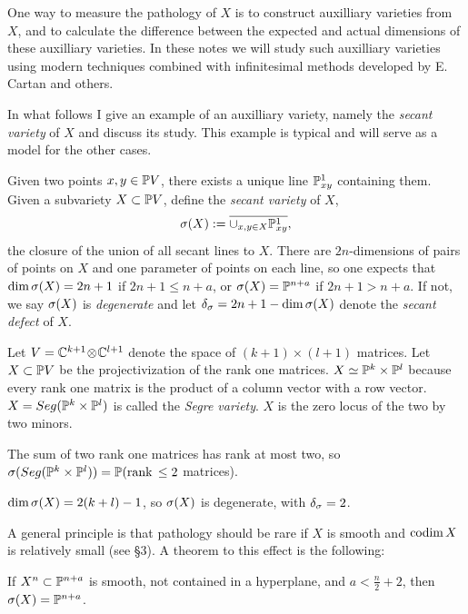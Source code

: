  
One way to measure the pathology of $X$ is to
 construct auxilliary varieties from $X$, and to calculate the
difference between the expected and actual 
     dimensions   of these auxilliary varieties.  
 In these notes we will  study such auxilliary 
varieties using modern techniques
combined with infinitesimal methods developed by
E. Cartan and others.

 

 In what follows I 
give an example of an auxilliary variety,
namely the {\it secant variety} of
$X$ and discuss its study. This example is typical   and will serve as a
model
for the other cases.



Given two points $x, y\in \Bbb P V$, there exists a unique
line $\Bbb P^1_{xy}$ containing them.
Given a subvariety $X\subset\Bbb P V$,   define
the {\it secant variety} of $X$, 
$$
\sigma (X):= \overline{\cup_{x,y\in X}\Bbb P^1_{xy}},
$$
 the closure of the union of all secant lines   to
$X$. There are $2n$-dimensions   of pairs of points
on $X$ and  one parameter of points on each line, so one expects
that $\text{dim}\,\sigma (X)= 2n+1$ if $2n+1\leq n+a$, or $\sigma (X)=\Bbb P^{n+a}$   if $2n+1>n+a$.
If not, 
we say $\sigma (X)$ is {\it degenerate} and  let $\delta_{\sigma}= 2n+1-\text{dim}\,\sigma (X)$ denote
the
{\it secant defect} of $X$.  

 
Let $V= \Bbb C^{k+1}\!\otimes\!\Bbb C^{l+1}$ denote the space of 
$(k+1)\times (l+1)$ matrices. Let $X\subset \Bbb P V$ be the projectivization
of the rank one matrices.   $X\simeq \Bbb P^{k}\times \Bbb P^{l}$
because every rank one matrix is the product of a column vector with
a row vector.
$X=Seg(\Bbb P^{k}\times\Bbb P^{l})$ is  called the {\it Segre variety}. $X$ is the
zero
locus of the   two by two minors.

The sum of two rank one matrices has rank at
most two, so   $\sigma(Seg(\Bbb P^{k}\times\Bbb P^{l}))=\Bbb P (\text{rank}\,\leq 2$ matrices). 

   $\text{dim}\,\sigma (X) = 2(k+l)-1$,
so $\sigma (X)$ is degenerate, with $\delta_{\sigma}=2$.

\smallpagebreak

A general principle  is
that pathology should be rare if $X$ is smooth and $\text{codim}\, X$ is
relatively small (see \S 3). A theorem to this effect
is the following:

If $X^n\subset\Bbb P^{n+a}$ is smooth, not contained in a hyperplane, and
$a<\frac
n2+2$, then $\sigma (X)=\Bbb P^{n+a}$.
\endproclaim

